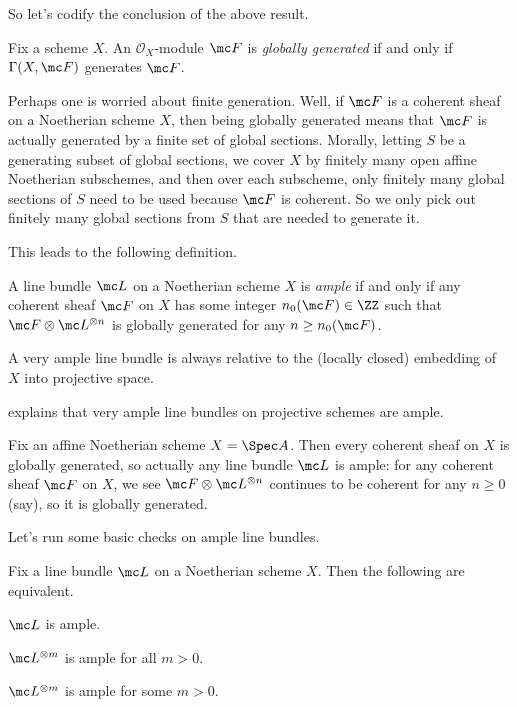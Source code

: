 \documentclass[../notes.tex]{subfiles}
\begin{document}
So let's codify the conclusion of the above result.
\begin{definition}
	Fix a scheme $X$. An $\mathcal O_X$-module $\mc F$ is \textit{globally generated} if and only if $\Gamma(X,\mc F)$ generates $\mc F$.
\end{definition}
\begin{remark}
	Perhaps one is worried about finite generation. Well, if $\mc F$ is a coherent sheaf on a Noetherian scheme $X$, then being globally generated means that $\mc F$ is actually generated by a finite set of global sections. Morally, letting $S$ be a generating subset of global sections, we cover $X$ by finitely many open affine Noetherian subschemes, and then over each subscheme, only finitely many global sections of $S$ need to be used because $\mc F$ is coherent. So we only pick out finitely many global sections from $S$ that are needed to generate it.
\end{remark}
This leads to the following definition.
\begin{definition}[ample]
	A line bundle $\mc L$ on a Noetherian scheme $X$ is \textit{ample} if and only if any coherent sheaf $\mc F$ on $X$ has some integer $n_0(\mc F)\in\ZZ$ such that $\mc F\otimes\mc L^{\otimes n}$ is globally generated for any $n\ge n_0(\mc F)$.
\end{definition}
\begin{remark}
	A very ample line bundle is always relative to the (locally closed) embedding of $X$ into projective space.
\end{remark}
\begin{example}
	 explains that very ample line bundles on projective schemes are ample.
\end{example}
\begin{example}
	Fix an affine Noetherian scheme $X=\Spec A$. Then every coherent sheaf on $X$ is globally generated, so actually any line bundle $\mc L$ is ample: for any coherent sheaf $\mc F$ on $X$, we see $\mc F\otimes\mc L^{\otimes n}$ continues to be coherent for any $n\ge0$ (say), so it is globally generated.
\end{example}
Let's run some basic checks on ample line bundles.
\begin{lemma} \label{lem:power-ample}
	Fix a line bundle $\mc L$ on a Noetherian scheme $X$. Then the following are equivalent.
	\begin{listroman}
		\item $\mc L$ is ample.
		\item $\mc L^{\otimes m}$ is ample for all $m>0$.
		\item $\mc L^{\otimes m}$ is ample for some $m>0$.
	\end{listroman}
\end{lemma}
\end{document}
